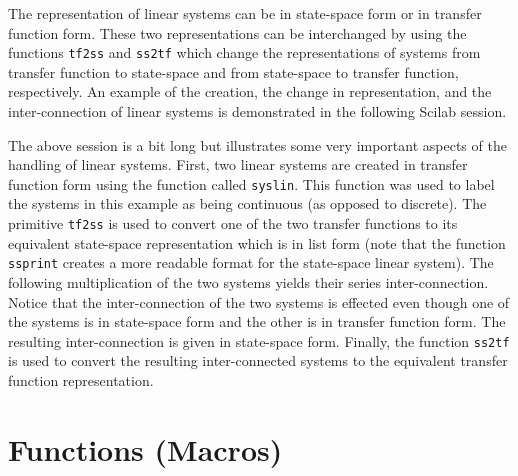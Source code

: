	The representation of linear systems can be in state-space
form or in transfer function form.  These two representations can
be interchanged by using the functions 
{\tt tf2ss} and 
{\tt ss2tf}
which change the representations of systems from transfer function
to state-space and from state-space to transfer function, respectively.
An example of the creation, the change in representation, and the
inter-connection of linear systems is demonstrated in the following
Scilab session.



The above session is a bit long but illustrates some very important
aspects of the handling of linear systems.  First, two linear systems
are created in transfer function form using the function called 
{\tt syslin}.
This function was used to label the systems in this example 
as being continuous (as opposed to discrete).  
The primitive {\tt tf2ss} is used to convert one of the
two transfer functions to its equivalent state-space representation
which is in list form (note that the function {\tt ssprint} creates a more
readable format for the state-space linear system).
The following multiplication of the two systems yields their
series inter-connection.  Notice that the inter-connection 
of the two systems is effected even though one of the systems is
in state-space form and the other is in transfer function form.
The resulting inter-connection is given in state-space form.
Finally, the function {\tt ss2tf} is used to convert the resulting
inter-connected systems to the equivalent transfer function representation.

\section{Functions (Macros)}
\label{s2.6}

